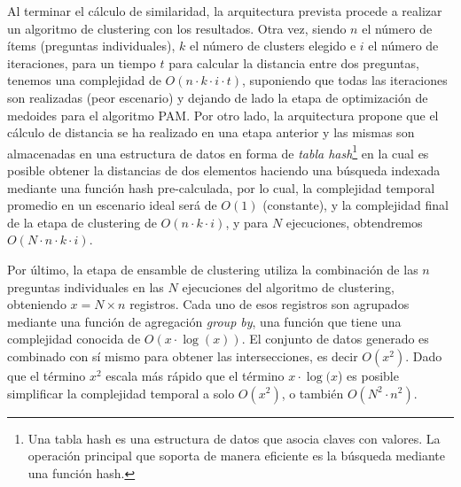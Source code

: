 \bigskip Al terminar el cálculo de similaridad, la arquitectura prevista procede a realizar un algoritmo de clustering con los resultados. Otra vez, siendo \(n\) el número de ítems (preguntas individuales), \(k\) el número de clusters elegido e \(i\) el número de iteraciones, para un tiempo \(t\) para calcular la distancia entre dos preguntas, tenemos una complejidad de \(O(n \cdot k \cdot i \cdot t)\), suponiendo que todas las iteraciones son realizadas (peor escenario) y dejando de lado la etapa de optimización de medoides para el algoritmo PAM. Por otro lado, la arquitectura propone que el cálculo de distancia se ha realizado en una etapa anterior y las mismas son almacenadas en una estructura de datos en forma de \textit{tabla hash}\footnote{Una tabla hash es una estructura de datos que asocia claves con valores. La operación principal que soporta de manera eficiente es la búsqueda mediante una función hash.} en la cual es posible obtener la distancias de dos elementos haciendo una búsqueda indexada mediante una función hash pre-calculada, por lo cual, la complejidad temporal promedio en un escenario ideal será de \(O(1)\) (constante), y la complejidad final de la etapa de clustering de \(O(n \cdot k \cdot i)\), y para \(N\) ejecuciones, obtendremos \(O(N \cdot n \cdot k \cdot i)\).

\bigskip Por último, la etapa de ensamble de clustering utiliza la combinación de las \(n\) preguntas individuales en las \(N\) ejecuciones del algoritmo de clustering, obteniendo \(x = N \times n\) registros. Cada uno de esos registros son agrupados mediante una función de agregación \textit{group by}, una función que tiene una complejidad conocida de  \(O(x \cdot \log(x))\). El conjunto de datos generado es combinado con sí mismo para obtener las intersecciones, es decir \(O(x^2)\). Dado que el término \(x^2\) escala más rápido que el término \(x \cdot \log(x\)) es posible simplificar la complejidad temporal a solo \(O(x^2)\), o también \(O(N^2 \cdot n^2)\).

